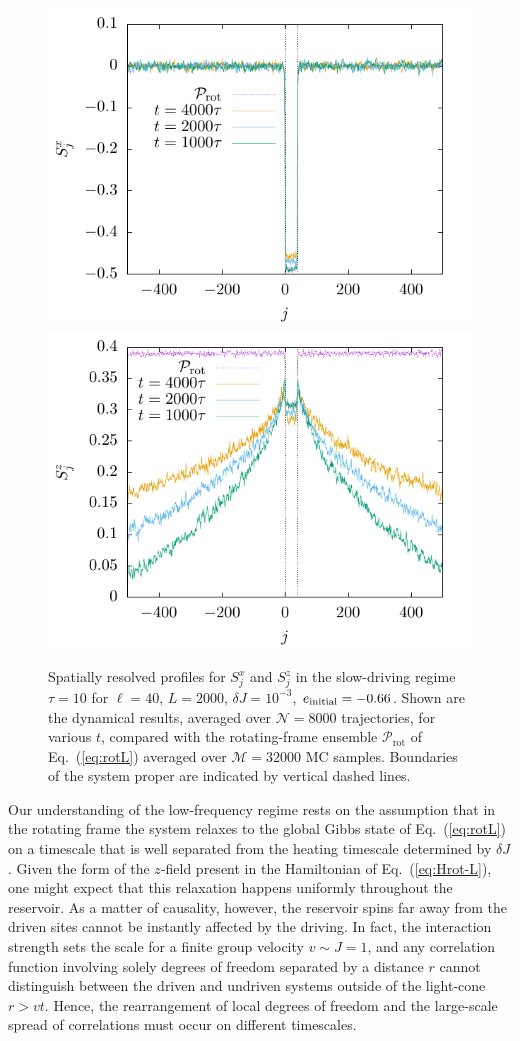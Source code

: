 \documentclass[aps,pre,twocolumn,notitlepage,floats,10pt]{revtex4-1}
\begin{document}
\begin{figure}[!ht]
  \includegraphics[width=0.45\linewidth]{figs/fig-8-sx-profile.pdf}
  \includegraphics[width=0.45\linewidth]{figs/fig-8-sz-profile.pdf}
  \caption{
    Spatially resolved profiles for $S_j^x$ and $S_j^z$ in the slow-driving
    regime $\tau=10$ for $\ell=40$, $L=2000$, $\delta J = 10^{-3}$, $e_{\rm
    initial}=-0.66$.
    Shown are the dynamical results, averaged over $\mathcal{N}=8000$
    trajectories, for various $t$, compared with the rotating-frame ensemble
    $\mathcal{P}_\mathrm{rot}$ of Eq.~(\ref{eq:rotL}) averaged over
    $\mathcal{M}=32000$ MC samples.
    Boundaries of the system proper are indicated by vertical dashed lines.
  } \label{fig:prof}
\end{figure}

\label{sec:drift}
Our understanding of the low-frequency regime rests on the assumption that in
the rotating frame the system relaxes to the global Gibbs state of
Eq.~(\ref{eq:rotL}) on a timescale that is well separated from the heating
timescale determined by $\delta J$.  Given the form of the $z$-field present in
the Hamiltonian of Eq.~(\ref{eq:Hrot-L}), one might expect that this relaxation
happens uniformly throughout the reservoir. 
As a matter of causality, however, the reservoir spins far away from the driven
sites cannot be instantly affected by the driving.
In fact, the interaction strength sets the scale for a finite group velocity
$v\sim J=1$, and any correlation function involving solely  degrees of freedom
separated by a distance $r$ cannot distinguish between the driven and undriven
systems outside of the light-cone $r>vt$.
Hence, the rearrangement of local degrees of freedom and the large-scale spread
of correlations must occur on different timescales.
\end{document}
